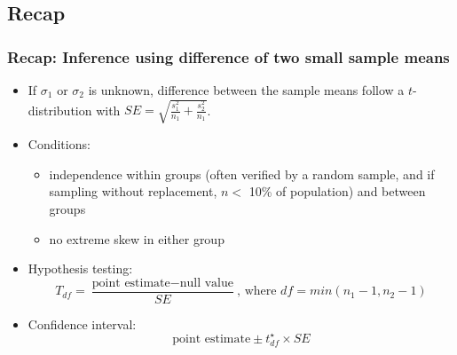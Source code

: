 \documentclass[slidestop,compress,mathserif]{beamer}
\begin{document}

\subsection{Recap}


\begin{frame}
\frametitle{Recap: Inference using difference of two small sample means}

\begin{itemize}

\item If $\sigma_1$ or $\sigma_2$ is unknown, difference between the sample means follow a $t$-distribution with $SE = \sqrt{ \frac{s_1^2}{n_1} + \frac{s_2^2}{n_1} }$.

\pause

\item Conditions: 
\begin{itemize}
\item independence within groups (often verified by a random sample, and if sampling without replacement, $n < $ 10\% of population) and between groups
\item no extreme skew in either group
\end{itemize}

\pause

\item Hypothesis testing: 
\[ T_{df} = \frac{\text{point estimate} - \text{null value}}{SE}\text{, where }df = min(n_1 - 1, n_2 - 1) \]

\pause

\item Confidence interval:
\[ \text{point estimate} \pm t_{df}^\star \times SE \]

\end{itemize}

\end{frame}


\end{document}
